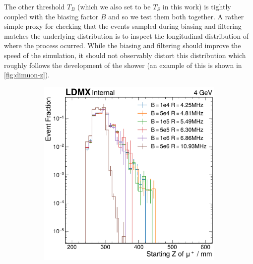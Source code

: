 The other threshold $T_B$ (which we also set to be $T_S$ in this work) is tightly coupled
with the biasing factor $B$ and so we test them both together.
A rather simple proxy for checking that the events sampled during biasing and filtering
matches the underlying distribution is to inspect the longitudinal distribution of where
the process ocurred.
While the biasing and filtering should improve the speed of the simulation,
it should not observably distort this distribution which roughly follows the development of
the shower (an example of this is shown in \cref{fig:dimuon-z}).

\begin{figure}
  \centering
  \begin{subfigure}{0.48\textwidth}
    \includegraphics[width=\textwidth]{figures/ldmx/simulation/dimuon-z-4gev.pdf}
  \end{subfigure}
  ~
  \begin{subfigure}{0.48\textwidth}

\end{subfigure}
\end{figure}
